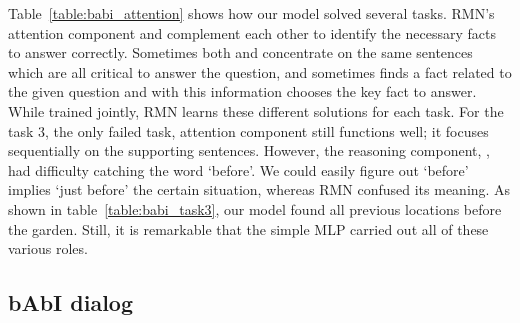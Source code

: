 \documentclass{article} \usepackage{iclr2018_conference,times}
\begin{document}
Table~\ref{table:babi_attention} shows how our model solved several tasks.
RMN's attention component  and  complement each other to identify the necessary facts to answer correctly.
Sometimes both  and  concentrate on the same sentences which are all critical to answer the question, and sometimes  finds a fact related to the given question and with this information  chooses the key fact to answer. 
While trained jointly, RMN learns these different solutions for each task.
For the task 3, the only failed task, attention component still functions well; it focuses sequentially on the  supporting sentences.  
However, the reasoning component, , had difficulty catching the word `before'. 
We could easily figure out `before' implies `just before' the certain situation, whereas RMN confused its meaning. 
As shown in table~\ref{table:babi_task3}, our model found all previous locations before the garden. 
Still, it is remarkable that the simple MLP carried out all of these various roles. 



\subsection{bAbI dialog}
\end{document}

